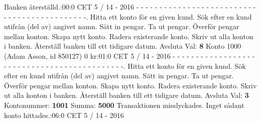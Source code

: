 Banken återställd.:00:0 CET 5 / 14 - 2016\newline
- - - - - - - - - - - - - - - - - - - - - - - - - - - - - - - - - - - - - - - - - - - -.   Hitta ett konto för en given kund.   Sök efter en kund utifrån (del av) angivet namn.   Sätt in pengar.   Ta ut pengar.   Överför pengar mellan konton.   Skapa nytt konto.   Radera existerande konto.   Skriv ut alla konton i banken.   Återställ banken till ett tidigare datum. Avsluta\newline
Val: \textbf{8}\newline
Konto 1000 (Adam Asson, id 850127) 0 kr:01:0 CET 5 / 14 - 2016\newline
- - - - - - - - - - - - - - - - - - - - - - - - - - - - - - - - - - - - - - - - - - - -.   Hitta ett konto för en given kund.   Sök efter en kund utifrån (del av) angivet namn.   Sätt in pengar.   Ta ut pengar.   Överför pengar mellan konton.   Skapa nytt konto.   Radera existerande konto.   Skriv ut alla konton i banken.   Återställ banken till ett tidigare datum. Avsluta\newline
Val: \textbf{3}\newline
Kontonummer: \textbf{1001}\newline
Summa: \textbf{5000}\newline
Transaktionen misslyckades. Inget sådant konto hittades.:06:0 CET 5 / 14 - 2016\newline
